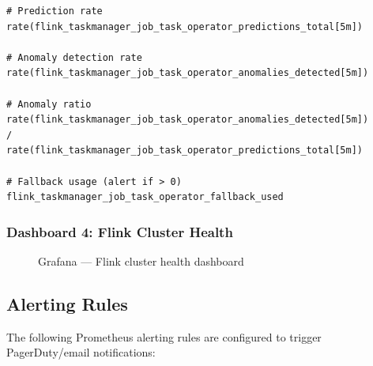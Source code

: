\begin{lstlisting}[caption={PromQL queries for AI monitoring}]
# Prediction rate
rate(flink_taskmanager_job_task_operator_predictions_total[5m])

# Anomaly detection rate
rate(flink_taskmanager_job_task_operator_anomalies_detected[5m])

# Anomaly ratio
rate(flink_taskmanager_job_task_operator_anomalies_detected[5m])
/
rate(flink_taskmanager_job_task_operator_predictions_total[5m])

# Fallback usage (alert if > 0)
flink_taskmanager_job_task_operator_fallback_used
\end{lstlisting}

\subsubsection{Dashboard 4: Flink Cluster Health}

\begin{figure}[H]
    \centering
    \caption{Grafana --- Flink cluster health dashboard}
    \label{fig:grafana-cluster}
\end{figure}

\subsection{Alerting Rules}

The following Prometheus alerting rules are configured to trigger PagerDuty/email notifications:

